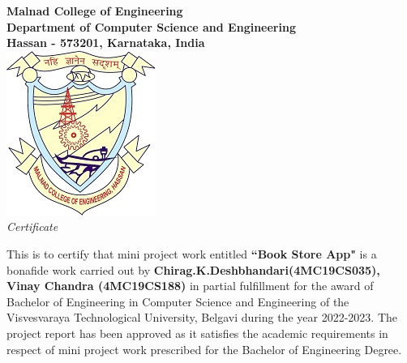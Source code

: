 \newpage

\thispagestyle{empty}

\thisfancypage{%
  \setlength{\fboxsep}{10pt}\doublebox}{}
	
\vspace*{1\baselineskip}
\begin{center}

\LARGE{\textbf{Malnad College of Engineering}} \\ 
\large{\textbf{Department of Computer Science and Engineering}}\\
\large{\textbf{Hassan - 573201, Karnataka, India}}\\[0.5cm]

\includegraphics[scale=0.5]{mce_logo.png}\\[0.5cm]

\emph{\LARGE Certificate}\\[1cm]
\end{center}

This is to certify that mini project work entitled \textbf{``Book Store App"} is a bonafide work carried out by \textbf{Chirag.K.Deshbhandari(4MC19CS035),
Vinay Chandra (4MC19CS188)} in partial fulfillment for the award of  Bachelor of Engineering in Computer Science and Engineering of the Visvesvaraya Technological University, Belgavi during the year 2022-2023.   The project report has been approved as it satisfies the academic requirements in respect of mini project work prescribed for the Bachelor of Engineering Degree. \\[1.0cm]

\vspace{0.25cm}

